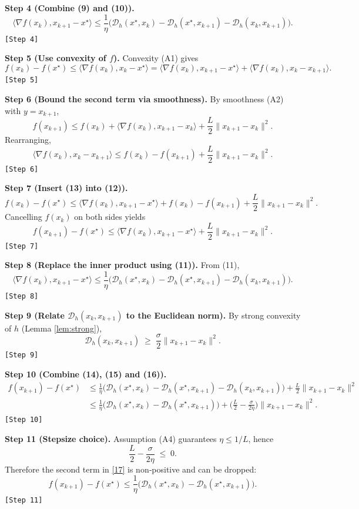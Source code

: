 \documentclass{article}
\newcommand{\D}{\mathcal{D}}
\begin{document}
\noindent\textbf{Step 4 (Combine (9) and (10)).}
\[
\langle\nabla f(x_{k}),x_{k+1}-x^{\star}\rangle
\le
\frac{1}{\eta}
\Big(
\D_{h}(x^{\star},x_{k})-\D_{h}(x^{\star},x_{k+1})-\D_{h}(x_{k},x_{k+1})
\Big). \tag{11}
\]
\texttt{[Step 4]}

\noindent\textbf{Step 5 (Use convexity of $f$).}  
Convexity (A1) gives
\[
f(x_{k})-f(x^{\star})
\le
\langle\nabla f(x_{k}),x_{k}-x^{\star}\rangle
=
\langle\nabla f(x_{k}),x_{k+1}-x^{\star}\rangle
+\langle\nabla f(x_{k}),x_{k}-x_{k+1}\rangle .
\tag{12}
\]
\texttt{[Step 5]}

\noindent\textbf{Step 6 (Bound the second term via smoothness).}  
By smoothness (A2) with $y=x_{k+1}$,
\[
f(x_{k+1})\le f(x_{k})+\langle\nabla f(x_{k}),x_{k+1}-x_{k}\rangle
+\frac{L}{2}\|x_{k+1}-x_{k}\|^{2}.
\]
Rearranging,
\[
\langle\nabla f(x_{k}),x_{k}-x_{k+1}\rangle
\le f(x_{k})-f(x_{k+1})+\frac{L}{2}\|x_{k+1}-x_{k}\|^{2}. \tag{13}
\]
\texttt{[Step 6]}

\noindent\textbf{Step 7 (Insert (13) into (12)).}
\[
f(x_{k})-f(x^{\star})
\le
\langle\nabla f(x_{k}),x_{k+1}-x^{\star}\rangle
+f(x_{k})-f(x_{k+1})+\frac{L}{2}\|x_{k+1}-x_{k}\|^{2}.
\]
Cancelling $f(x_{k})$ on both sides yields
\[
f(x_{k+1})-f(x^{\star})
\le
\langle\nabla f(x_{k}),x_{k+1}-x^{\star}\rangle
+\frac{L}{2}\|x_{k+1}-x_{k}\|^{2}. \tag{14}
\]
\texttt{[Step 7]}

\noindent\textbf{Step 8 (Replace the inner product using (11)).}
From (11),
\[
\langle\nabla f(x_{k}),x_{k+1}-x^{\star}\rangle
\le
\frac{1}{\eta}
\Big(
\D_{h}(x^{\star},x_{k})-\D_{h}(x^{\star},x_{k+1})-\D_{h}(x_{k},x_{k+1})
\Big).
\tag{15}
\]
\texttt{[Step 8]}

\noindent\textbf{Step 9 (Relate $\D_{h}(x_{k},x_{k+1})$ to the Euclidean norm).}  
By strong convexity of $h$ (Lemma \ref{lem:strong}),
\[
\D_{h}(x_{k},x_{k+1})\;\ge\;\frac{\sigma}{2}\|x_{k+1}-x_{k}\|^{2}. \tag{16}
\]
\texttt{[Step 9]}

\noindent\textbf{Step 10 (Combine (14), (15) and (16)).}
\[
\begin{aligned}
f(x_{k+1})-f(x^{\star})
&\le
\frac{1}{\eta}\Big(
\D_{h}(x^{\star},x_{k})-\D_{h}(x^{\star},x_{k+1})-\D_{h}(x_{k},x_{k+1})\Big)
+\frac{L}{2}\|x_{k+1}-x_{k}\|^{2}\\[4pt]
&\le
\frac{1}{\eta}\Big(
\D_{h}(x^{\star},x_{k})-\D_{h}(x^{\star},x_{k+1})\Big)
+\Big(\frac{L}{2}-\frac{\sigma}{2\eta}\Big)\|x_{k+1}-x_{k}\|^{2}.
\end{aligned}
\tag{17}
\]
\texttt{[Step 10]}

\noindent\textbf{Step 11 (Stepsize choice).}  
Assumption (A4) guarantees $\eta\le 1/L$, hence
\[
\frac{L}{2}-\frac{\sigma}{2\eta}\;\le\;0.
\]
Therefore the second term in \eqref{17} is non‑positive and can be dropped:
\[
f(x_{k+1})-f(x^{\star})
\le
\frac{1}{\eta}\Big(
\D_{h}(x^{\star},x_{k})-\D_{h}(x^{\star},x_{k+1})\Big). \tag{18}
\]
\texttt{[Step 11]}
\end{document}
